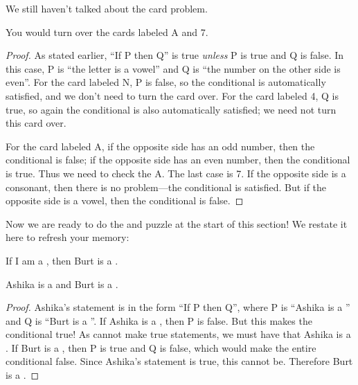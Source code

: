 \documentclass{tufte-book}
\begin{document}
We still haven't talked about the card problem. 

\begin{claim}
  You would turn over the cards labeled A and 7.
\end{claim}

\begin{proof}
  As stated earlier, ``If P then Q'' is true \emph{unless} P is true and Q is false. In this case, P is ``the letter is a vowel'' and Q is ``the number on the other side is even''. For the card labeled N, P is false, so the conditional is automatically satisfied, and we don't need to turn the card over. For the card labeled 4, Q is true, so again the conditional is also automatically satisfied; we need not turn this card over.

  For the card labeled A, if the opposite side has an odd number, then the conditional is false; if the opposite side has an even number, then the conditional is true. Thus we need to check the A. The last case is 7. If the opposite side is a consonant, then there is no problem---the conditional is satisfied. But if the opposite side is a vowel, then the conditional is false.
\end{proof}

Now we are ready to do the \knights and \knaves puzzle at the start of this section! We restate it here to refresh your memory:
  \begin{dialogue}
     If I am a \knight, then Burt is a \knave.
  \end{dialogue}

  \begin{claim}
    Ashika is a \knight and Burt is a \knave.
  \end{claim}

  \begin{proof}
    Ashika's statement is in the form ``If P then Q'', where P is ``Ashika is a \knight'' and Q is ``Burt is a \knave''. If Ashika is a \knave, then P is false. But this makes the conditional true! As \knaves cannot make true statements, we must have that Ashika is a \knight. If Burt is a \knight, then P is true and Q is false, which would make the entire conditional false. Since Ashika's statement is true, this cannot be. Therefore Burt is a \knave.
  \end{proof} 
\end{document}
